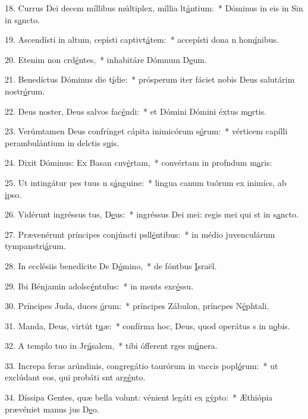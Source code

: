 18. Currus Dei decem míllibus múltiplex, míllia lt\uline{á}ntium:~* Dóminus in eis in Sin in s\uline{a}ncto.\par 
19. Ascendísti in altum, cepísti captivt\uline{á}tem:~* accepísti dona n hom\uline{í}nibus.\par 
20. Etenim non crd\uline{é}ntes,~* inhabitáre Dómnum D\uline{e}um.\par 
21. Benedíctus Dóminus die t\uline{í}die:~* prósperum iter fáciet nobis Deus salutárim nostr\uline{ó}rum.\par 
22. Deus noster, Deus salvos fac\uline{é}ndi:~* et Dómini Dómini éxtus m\uline{o}rtis.\par 
23. Verúmtamen Deus confrínget cápita inimicórum s\uline{ó}rum:~* vérticem capílli perambulántium in delctis s\uline{u}is.\par 
24. Dixit Dóminus: Ex Basan cnv\uline{é}rtam,~* convértam in profndum m\uline{a}ris:\par 
25. Ut intingátur pes tuus n s\uline{á}nguine:~* lingua canum tuórum ex inimícs, ab \uline{i}pso.\par 
26. Vidérunt ingréssus tus, D\uline{e}us:~* ingréssus Dei mei: regis mei qui st in s\uline{a}ncto.\par 
27. Prævenérunt príncipes conjúncti psll\uline{é}ntibus:~* in médio juvenculárum tympanstri\uline{á}rum.\par 
28. In ecclésiis benedícite De D\uline{ó}mino,~* de fóntbus \uline{I}sraël.\par 
29. Ibi Bénjamin adolsc\uline{é}ntulus:~* in ments exc\uline{é}ssu.\par 
30. Príncipes Juda, duces \uline{ó}rum:~* príncipes Zábulon, príncpes N\uline{é}phtali.\par 
31. Manda, Deus, virtút t\uline{u}æ:~* confírma hoc, Deus, quod operátus s in n\uline{o}bis.\par 
32. A templo tuo in Jr\uline{ú}salem,~* tibi ófferent rges m\uline{ú}nera.\par 
33. Increpa feras arúndinis, congregátio taurórum in vaccis popl\uline{ó}rum:~* ut exclúdant eos, qui probáti snt arg\uline{é}nto.\par 
34. Díssipa Gentes, quæ bella volunt: vénient legáti ex g\uline{ý}pto:~* Æthiópia prævéniet manus jus D\uline{e}o.\par 
